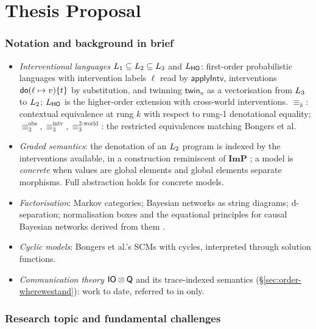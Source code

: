 \part{Thesis Proposal}

\section*{Notation and background in brief}
\begin{itemize}[nosep]
\item \emph{Interventional languages} $L_{1}\subseteq L_{2}\subseteq L_{3}$ and $L_{\mathsf{HO}}$: first-order probabilistic languages with intervention labels $\ell$ read by $\mathsf{applyIntv}$, interventions $\mathsf{do}(\ell\mapsto v)\{t\}$ by substitution, and twinning $\mathsf{twin}_n$ as a vectorisation from $L_{3}$ to $L_{2}$; $L_{\mathsf{HO}}$ is the higher-order extension with cross-world interventions. $\equiv_k$: contextual equivalence at rung $k$ with respect to rung-1 denotational equality; $\equiv_3^{\mathrm{obs}}, \equiv_3^{\mathrm{intv}}, \equiv_3^{\text{2-world}}$: the restricted equivalences matching Bongers et al.
\item \emph{Graded semantics}: the denotation of an $L_{2}$ program is indexed by the interventions available, in a construction reminiscent of $\mathbf{ImP}$ \cite{liell2025compositional}; a model is \emph{concrete} when values are global elements and global elements separate morphisms. Full abstraction holds for concrete models.
\item \emph{Factorisation}: Markov categories; Bayesian networks as string diagrams; d-separation; normalisation boxes \cite{jacobsszelesstein2025inference} and the equational principles for causal Bayesian networks derived from them \cite{agrawal2026equational}.
\item \emph{Cyclic models}: Bongers et al.'s SCMs with cycles, interpreted through solution functions.
\item \emph{Communication theory} $\mathsf{IO}\otimes\mathsf{Q}$ and its trace-indexed semantics (\S\ref{sec:order-wherewestand}): work to date, referred to in  only.
\end{itemize}

\section{Research topic and fundamental challenges}

